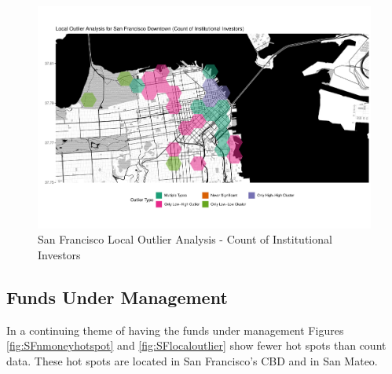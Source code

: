 \begin{figure}
	\centering
	\includegraphics[width=1\linewidth]{Figures/ChapterIV/SF_Count_LO_Downtown}
	\caption[Downtown San Francisco Local Outlier Analysis - Count of Institutional Investors 1999-2018]{San Francisco Local Outlier Analysis - Count of Institutional Investors}
	\label{fig:SFcountlocaloutliercount_Downtown}
\end{figure}

\subsection{Funds Under Management}

In a continuing theme of having the funds under management Figures \ref{fig:SFnmoneyhotspot} and \ref{fig:SFlocaloutlier} show fewer hot spots than count data.  These hot spots are located in San Francisco's CBD and in San Mateo.  	

